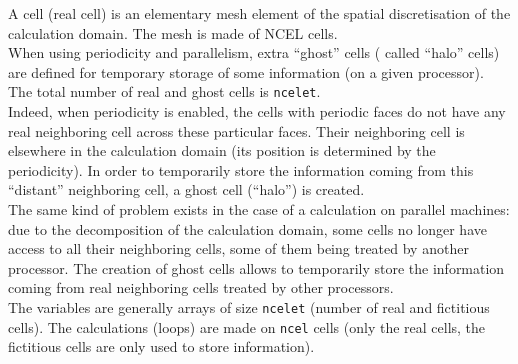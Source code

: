 {{{





\bigskip




A cell (real cell) is an elementary mesh element of the spatial
discretisation of the calculation domain. The mesh is made of NCEL cells.\\
When using periodicity and parallelism, extra ``ghost'' cells
( called ``halo'' cells) are defined for temporary storage of some information
(on a given processor).
The total number of real and ghost cells is \texttt{ncelet}. \\
\hspace*{1cm} Indeed, when periodicity is enabled, the cells with
periodic faces do not have any real neighboring cell across these
particular faces. Their neighboring cell is elsewhere in the calculation
domain (its position is determined by the periodicity). In order to
temporarily store the information coming from this ``distant''
neighboring cell, a ghost cell (``halo'') is created. \\
\hspace*{1cm} The same kind of problem exists in the case of a
calculation on parallel machines: due to the decomposition of the
calculation domain, some cells no longer have access to all
their neighboring cells, some of them being treated by another processor. The
creation of ghost cells allows to temporarily store the information
coming from real neighboring cells treated by other processors.\\
The variables are generally arrays of size \texttt{ncelet} (number of real and
fictitious cells). The calculations (loops) are made on \texttt{ncel} cells (only
the real cells, the fictitious cells are only used to store information).

}}}
